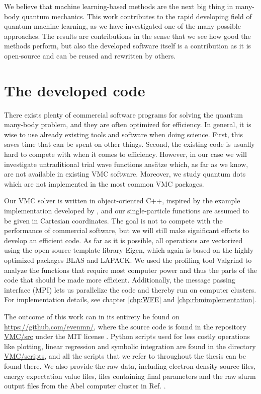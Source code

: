 We believe that machine learning-based methods are the next big thing in many-body quantum mechanics. This work contributes to the rapid developing field of quantum machine learning, as we have investigated one of the many possible approaches. The results are contributions in the sense that we see how good the methods perform, but also the developed software itself is a contribution as it is open-source and can be reused and rewritten by others.

\section{The developed code}
There exists plenty of commercial software programs for solving the quantum many-body problem, and they are often optimized for efficiency. In general, it is wise to use already existing tools and software when doing science. First, this saves time that can be spent on other things. Second, the existing code is usually hard to compete with when it comes to efficiency. However, in our case we will investigate untraditional trial wave functions ansätze which, as far as we know, are not available in existing VMC software. Moreover, we study quantum dots which are not implemented in the most common VMC packages. 

Our VMC solver is written in object-oriented C++, inspired by the example implementation developed by \citet{ledum_simple_2016}, and our single-particle functions are assumed to be given in Cartesian coordinates. The goal is not to compete with the performance of commercial software, but we will still make significant efforts to develop an efficient code. As far as it is possible, all operations are vectorized using the open-source template library Eigen, which again is based on the highly optimized packages BLAS and LAPACK. We used the profiling tool Valgrind to analyze the functions that require most computer power and thus the parts of the code that should be made more efficient. Additionally, the message passing interface (MPI) lets us parallelize the code and thereby run on computer clusters. For implementation details, see chapter \ref{chp:WFE} and \ref{chp:rbmimplementation}. 

The outcome of this work can in its entirety be found on \url{https://github.com/evenmn/}, where the source code is found in the repository \href{https://github.com/evenmn/VMC/tree/master/src}{VMC/src} under the MIT license \supercite{noauthor_mit_nodate}. Python scripts used for less costly operations like plotting, linear regression and symbolic integration are found in the directory \href{https://github.com/evenmn/VMC/tree/master/scripts}{VMC/scripts}, and all the scripts that we refer to throughout the thesis can be found there. We also provide the raw data, including electron density source files, energy expectation value files, files containing final parameters and the raw slurm output files from the Abel computer cluster in Ref. \cite{nordhagen_even_marius_2019_3477946}.

